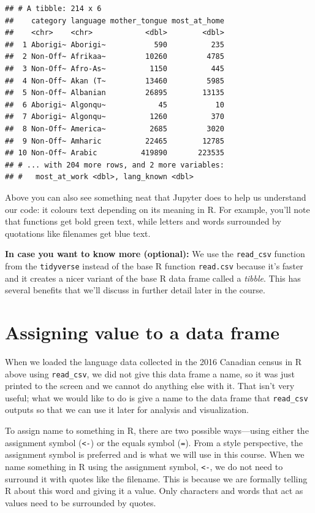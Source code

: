 \documentclass[
]{krantz}
\renewenvironment{quote}{\begin{VF}}{\end{VF}}
\begin{document}
\begin{verbatim}
## # A tibble: 214 x 6
##    category language mother_tongue most_at_home
##    <chr>    <chr>            <dbl>        <dbl>
##  1 Aborigi~ Aborigi~           590          235
##  2 Non-Off~ Afrikaa~         10260         4785
##  3 Non-Off~ Afro-As~          1150          445
##  4 Non-Off~ Akan (T~         13460         5985
##  5 Non-Off~ Albanian         26895        13135
##  6 Aborigi~ Algonqu~            45           10
##  7 Aborigi~ Algonqu~          1260          370
##  8 Non-Off~ America~          2685         3020
##  9 Non-Off~ Amharic          22465        12785
## 10 Non-Off~ Arabic          419890       223535
## # ... with 204 more rows, and 2 more variables:
## #   most_at_work <dbl>, lang_known <dbl>
\end{verbatim}

Above you can also see something neat that Jupyter does to help us understand our code: it colours text depending on its meaning in R. For example,
you'll note that functions get bold green text, while letters and words surrounded by quotations like filenames get blue text.

\begin{quote}
\textbf{In case you want to know more (optional):}
We use the \texttt{read\_csv} function from the \texttt{tidyverse} instead of the base R function \texttt{read.csv} because it's faster and it creates a nicer variant of the base R data frame called a \emph{tibble}.
This has several benefits that we'll discuss in further detail later in the course.
\end{quote}

\hypertarget{assigning-value-to-a-data-frame}{%
\section{Assigning value to a data frame}\label{assigning-value-to-a-data-frame}}

When we loaded the language data collected in the 2016 Canadian census in R above using \texttt{read\_csv}, we did not give this data frame a name, so it was
just printed to the screen and we cannot do anything else with it. That isn't very useful; what we would like to do is give a name to the data frame that \texttt{read\_csv} outputs
so that we can use it later for analysis and visualization.

To assign name to something in R, there are two possible ways---using either the assignment symbol (\texttt{\textless{}-}) or the equals symbol (\texttt{=}). From a style perspective,
the assignment symbol is preferred and is what we will use in this course. When we name something in R using the assignment symbol, \texttt{\textless{}-}, we do not need to surround
it with quotes like the filename. This is because we are formally telling R about this word and giving it a value. Only characters and words that act as values need
to be surrounded by quotes.
\end{document}
